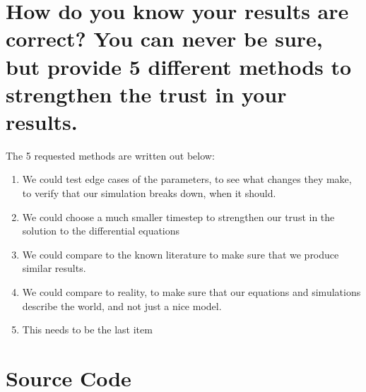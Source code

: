 \documentclass{article}
\begin{document}
\section*{How do you know your results are correct? You can never be sure, but provide 5 different methods to strengthen the trust in your results.}
The 5 requested methods are written out below:
\begin{enumerate}
    \item We could test edge cases of the parameters, to see what changes they make, to verify that our simulation breaks down, when it should.
    \item We could choose a much smaller timestep to strengthen our trust in the solution to the differential equations
    \item We could compare to the known literature to make sure that we produce similar results.
    \item We could compare to reality, to make sure that our equations and simulations describe the world, and not just a nice model.
    \item This needs to be the last item
\end{enumerate}
\newpage
\section*{Source Code}

\end{document}
